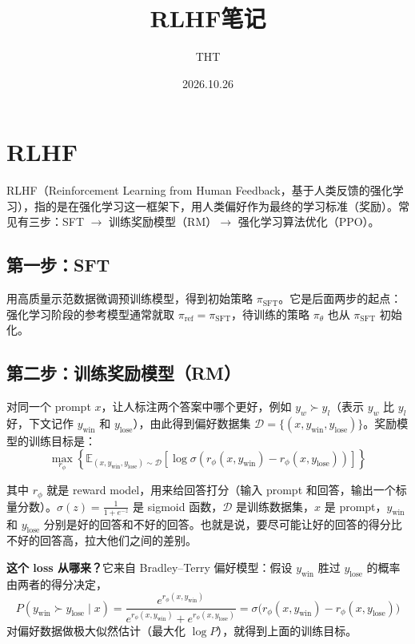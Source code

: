 \documentclass[UTF8,fontset=fandol]{ctexart}
\title{RLHF笔记}
\author{THT}
\date{2026.10.26}
\begin{document}
\maketitlecolored

\section{RLHF}

RLHF（Reinforcement Learning from Human Feedback，基于人类反馈的强化学习），指的是在强化学习这一框架下，用人类偏好作为最终的学习标准（奖励）。常见有三步：SFT \(\rightarrow\) 训练奖励模型（RM）\(\rightarrow\) 强化学习算法优化（PPO）。

\subsection{第一步：SFT}

用高质量示范数据微调预训练模型，得到初始策略 \(\pi_{\text{SFT}}\)。它是后面两步的起点：强化学习阶段的参考模型通常就取 \(\pi_{\text{ref}} = \pi_{\text{SFT}}\)，待训练的策略 \(\pi_\theta\) 也从 \(\pi_{\text{SFT}}\) 初始化。

\subsection{第二步：训练奖励模型（RM）}

对同一个 prompt \(x\)，让人标注两个答案中哪个更好，例如 \(y_w \succ y_l\)（表示 \(y_w\) 比 \(y_l\) 好，下文记作 \(y_{\text{win}}\) 和 \(y_{\text{lose}}\)），由此得到偏好数据集 \(\mathcal{D} = \{(x, y_{\text{win}}, y_{\text{lose}})\}\)。奖励模型的训练目标是：
\[
\max_{r_\phi} \left\{ \mathbb{E}_{(x, y_{\text{win}}, y_{\text{lose}}) \sim \mathcal{D}} \left[ \log \sigma (r_\phi(x, y_{\text{win}}) - r_\phi(x, y_{\text{lose}})) \right] \right\}
\]

其中 \(r_\phi\) 就是 reward model，用来给回答打分（输入 prompt 和回答，输出一个标量分数）。\(\sigma(z) = \frac{1}{1 + e^{-z}}\) 是 sigmoid 函数，\(\mathcal{D}\) 是训练数据集，\(x\) 是 prompt，\(y_{\text{win}}\) 和 \(y_{\text{lose}}\) 分别是好的回答和不好的回答。也就是说，要尽可能让好的回答的得分比不好的回答高，拉大他们之间的差别。

\textbf{这个 loss 从哪来？}它来自 Bradley--Terry 偏好模型：假设 \(y_{\text{win}}\) 胜过 \(y_{\text{lose}}\) 的概率由两者的得分决定，
\[
P(y_{\text{win}} \succ y_{\text{lose}} \mid x)
= \frac{e^{r_\phi(x, y_{\text{win}})}}{e^{r_\phi(x, y_{\text{win}})} + e^{r_\phi(x, y_{\text{lose}})}}
= \sigma\big(r_\phi(x, y_{\text{win}}) - r_\phi(x, y_{\text{lose}})\big)
\]
对偏好数据做极大似然估计（最大化 \(\log P\)），就得到上面的训练目标。
\end{document}
